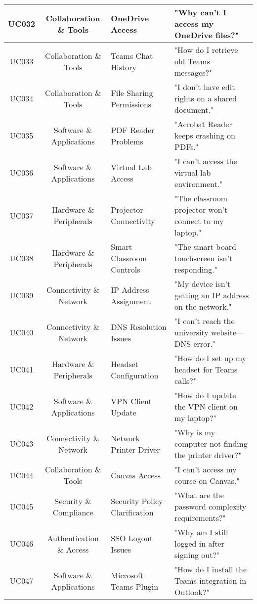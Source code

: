 \documentclass{article.cls}
\begin{document}
\begin{longtable}{|c|c|p{3.5cm}|p{6.5cm}|}
        \hline
        UC032 & Collaboration \& Tools & OneDrive Access & "Why can’t I access my OneDrive files?" \\
        \hline
        UC033 & Collaboration \& Tools & Teams Chat History & "How do I retrieve old Teams messages?" \\
        \hline
        UC034 & Collaboration \& Tools & File Sharing Permissions & "I don’t have edit rights on a shared document." \\
        \hline
        UC035 & Software \& Applications & PDF Reader Problems & "Acrobat Reader keeps crashing on PDFs." \\
        \hline
        UC036 & Software \& Applications & Virtual Lab Access & "I can’t access the virtual lab environment." \\
        \hline
        UC037 & Hardware \& Peripherals & Projector Connectivity & "The classroom projector won’t connect to my laptop." \\
        \hline
        UC038 & Hardware \& Peripherals & Smart Classroom Controls & "The smart board touchscreen isn’t responding." \\
        \hline
        UC039 & Connectivity \& Network & IP Address Assignment & "My device isn’t getting an IP address on the network." \\
        \hline
        UC040 & Connectivity \& Network & DNS Resolution Issues & "I can’t reach the university website—DNS error." \\
        \hline
        UC041 & Hardware \& Peripherals & Headset Configuration & "How do I set up my headset for Teams calls?" \\
        \hline
        UC042 & Software \& Applications & VPN Client Update & "How do I update the VPN client on my laptop?" \\
        \hline
        UC043 & Connectivity \& Network & Network Printer Driver & "Why is my computer not finding the printer driver?" \\
        \hline
        UC044 & Collaboration \& Tools & Canvas Access & "I can’t access my course on Canvas." \\
        \hline
        UC045 & Security \& Compliance & Security Policy Clarification & "What are the password complexity requirements?" \\
        \hline
        UC046 & Authentication \& Access & SSO Logout Issues & "Why am I still logged in after signing out?" \\
        \hline
        UC047 & Software \& Applications & Microsoft Teams Plugin & "How do I install the Teams integration in Outlook?" \\

\end{longtable}
\end{document}
